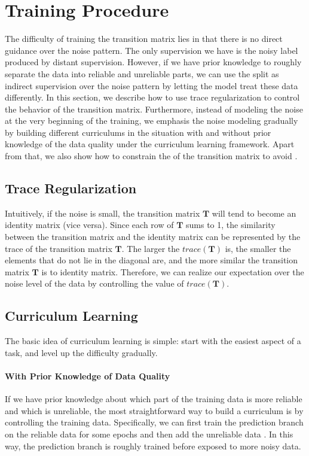 \section{Training Procedure} 
The difficulty of training the transition matrix lies in that there is no direct guidance over the noise pattern. The only supervision we have is the noisy label produced by distant supervision. However, if we have prior knowledge to roughly separate the data into reliable and unreliable parts, we can use the split as indirect supervision over the noise pattern by letting the model treat these data differently. In this section, we describe how to use trace regularization to control the behavior of the transition matrix. Furthermore, instead of modeling the noise at the very beginning of the training, we emphasis the noise modeling gradually by building different curriculums in the situation with and without prior knowledge of the data quality under the curriculum learning framework. Apart from that, we also show how to constrain the  of the transition matrix to avoid .

\subsection{Trace Regularization}
Intuitively, if the noise is small, the transition matrix $\mathbf{T}$ will tend to become an identity matrix (vice versa).  Since each row of $\mathbf{T}$ sums to 1, the similarity between the transition matrix and the identity matrix can be represented by the trace of the transition matrix $\mathbf{T}$. The larger the $trace(\mathbf{T})$ is, the smaller the elements that do not lie in the diagonal are, and the more similar the transition matrix $\mathbf{T}$ is to identity matrix. Therefore, we can realize our expectation over the noise level of the data by controlling the value of $trace(\mathbf{T})$.

\subsection{Curriculum Learning}
The basic idea of curriculum learning is simple: start with the easiest aspect of a task, and level up the difficulty gradually. 

\paragraph{With Prior Knowledge of Data Quality}
If we have prior knowledge about which part of the training data is more reliable and which is unreliable, the most straightforward way to build a curriculum is by controlling  the training data. Specifically, we can first train the prediction branch on the reliable data for some epochs and then add the unreliable data . In this way, the prediction branch is roughly trained before exposed to more noisy data.


